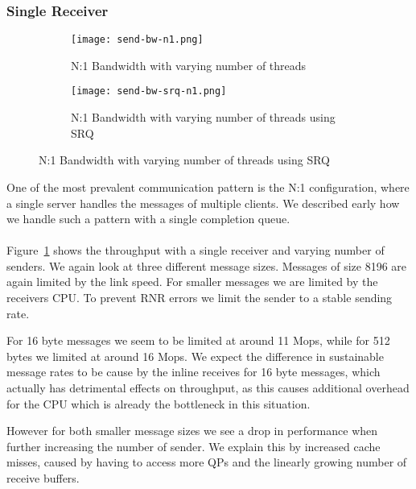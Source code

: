 \subsubsection{Single Receiver}


\begin{figure}[]
\begin{subfigure}[b]{0.49\textwidth}
  \centering
  \texttt{[image: send-bw-n1.png]}
  \caption{N:1 Bandwidth with varying number of threads}
  \label{fig:plot-sndrcv-bw-n1}
\end{subfigure}
\begin{subfigure}[b]{0.49\textwidth}
  \centering
  \texttt{[image: send-bw-srq-n1.png]}
  \caption{N:1 Bandwidth with varying number of threads using SRQ}
  \label{fig:plot-sndrcv-bw-srq-n1}
\end{subfigure}
\end{figure}



One of the most prevalent communication pattern is the N:1 configuration, where a single server handles the messages
of multiple clients. We described early how we handle such a pattern with a single completion queue.

\paragraph{} Figure~\ref{fig:plot-sndrcv-bw-n1} shows the throughput with a single receiver and varying number of senders.
We again look at three different message sizes. Messages of size 8196 are again limited by the link speed. For smaller messages
we are limited by the receivers CPU. To prevent RNR errors we limit the sender to a stable sending rate.

For 16 byte messages we seem to be limited at around 11 Mops, while for 512 bytes we limited at around 16 Mops. We expect the
difference in sustainable message rates to be cause by the inline receives for 16 byte messages, which actually has detrimental
effects on throughput, as this causes additional overhead for the CPU which is already the bottleneck in this situation.

However for both smaller message sizes we see a drop in performance when further increasing the number of sender. We explain 
this by increased cache misses, caused by having to access more QPs and the linearly growing number of receive buffers.

